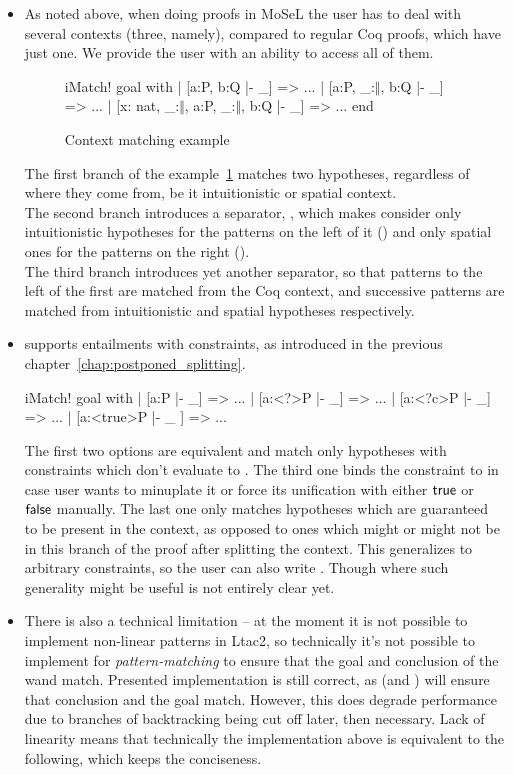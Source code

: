 \begin{itemize}
\item As noted above, when doing proofs in MoSeL the user has to deal with several contexts (three, namely), compared to regular Coq proofs, which have just one.
  We provide the user with an ability to access all of them.
  \begin{figure}[H]
  \begin{coq}
       iMatch! goal with
       | [a:P, b:Q |- _] => ...
       | [a:P, _:$\Vert$, b:Q |- _] => ...
       | [x: nat, _:$\Vert$, a:P, _:$\Vert$, b:Q |- _] => ...
       end
   \end{coq}
   \caption{Context matching example}
   \label{fig:example:contex_matching}
  \end{figure}
  The first branch of the example~\ref{fig:example:contex_matching} matches two hypotheses, regardless of where they come from, be it intuitionistic or spatial context.\\
  The second branch introduces a separator, \coqe{_:$\Vert$}, which makes  consider only intuitionistic hypotheses for the patterns on the left of it () and only spatial ones for the patterns on the right ().\\
  The third branch introduces yet another separator, so that patterns to the left of the first \coqe{_:$\Vert$} are matched from the Coq context, and successive patterns are matched from intuitionistic and spatial hypotheses respectively.

\item {} supports entailments with constraints, as introduced in the previous chapter~\ref{chap:postponed_splitting}.
\begin{coq}
iMatch! goal with
| [a:P |- _] => ...
| [a:<?>P |- _] => ...
| [a:<?c>P |- _] => ...
| [a:<true>P |- _ ] => ...
\end{coq}
The first two options are equivalent and match only hypotheses with constraints which don't evaluate to \false.
The third one binds the constraint to  in case user wants to minuplate it or force its unification with either $\textsf{true}$ or $\textsf{false}$ manually.
The last one only matches hypotheses which are guaranteed to be present in the context, as opposed to ones which might or might not be in this branch of the proof after splitting the context.
This generalizes to arbitrary constraints, so the user can also write .
Though where such generality might be useful is not entirely clear yet.
\item There is also a technical limitation -- at the moment it is not possible to implement non-linear patterns in Ltac2, so technically it's not possible to implement  for \emph{pattern-matching} to ensure that the goal and conclusion of the wand match.
  Presented implementation is still correct, as  (and ) will ensure that conclusion and the goal match.
  However, this does degrade performance due to branches of backtracking being cut off later, then necessary.
  Lack of linearity means that technically the implementation above is equivalent to the following, which keeps the conciseness.


\end{itemize}
